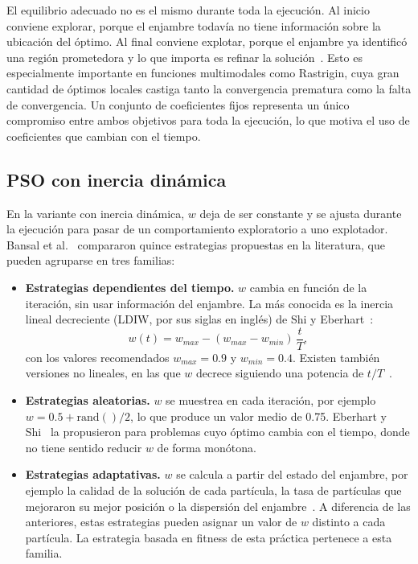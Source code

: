 El equilibrio adecuado no es el mismo durante toda la ejecución. Al inicio conviene explorar, porque el enjambre todavía no tiene información sobre la ubicación del óptimo. Al final conviene explotar, porque el enjambre ya identificó una región prometedora y lo que importa es refinar la solución~\cite{shi1999empirical, zhan2009adaptive}. Esto es especialmente importante en funciones multimodales como Rastrigin, cuya gran cantidad de óptimos locales castiga tanto la convergencia prematura como la falta de convergencia. Un conjunto de coeficientes fijos representa un único compromiso entre ambos objetivos para toda la ejecución, lo que motiva el uso de coeficientes que cambian con el tiempo.


\subsection{PSO con inercia dinámica}
\label{sec:inercia_dinamica}

En la variante con inercia dinámica, $w$ deja de ser constante y se ajusta durante la ejecución para pasar de un comportamiento exploratorio a uno explotador. Bansal et al.~\cite{bansal2011inertia} compararon quince estrategias propuestas en la literatura, que pueden agruparse en tres familias:

\begin{itemize}
    \item \textbf{Estrategias dependientes del tiempo.} $w$ cambia en función de la iteración, sin usar información del enjambre. La más conocida es la inercia lineal decreciente (LDIW, por sus siglas en inglés) de Shi y Eberhart~\cite{shi1999empirical}:
    \begin{equation}
        w(t) = w_{max} - (w_{max} - w_{min})\,\frac{t}{T},
        \label{eq:ldiw}
    \end{equation}
    con los valores recomendados $w_{max} = 0.9$ y $w_{min} = 0.4$. Existen también versiones no lineales, en las que $w$ decrece siguiendo una potencia de $t/T$~\cite{chatterjee2006nonlinear}.

    \item \textbf{Estrategias aleatorias.} $w$ se muestrea en cada iteración, por ejemplo $w = 0.5 + \mathrm{rand}()/2$, lo que produce un valor medio de 0.75. Eberhart y Shi~\cite{eberhart2001tracking} la propusieron para problemas cuyo óptimo cambia con el tiempo, donde no tiene sentido reducir $w$ de forma monótona.

    \item \textbf{Estrategias adaptativas.} $w$ se calcula a partir del estado del enjambre, por ejemplo la calidad de la solución de cada partícula, la tasa de partículas que mejoraron su mejor posición o la dispersión del enjambre~\cite{nickabadi2011novel, zhan2009adaptive}. A diferencia de las anteriores, estas estrategias pueden asignar un valor de $w$ distinto a cada partícula. La estrategia basada en fitness de esta práctica pertenece a esta familia.
\end{itemize}

